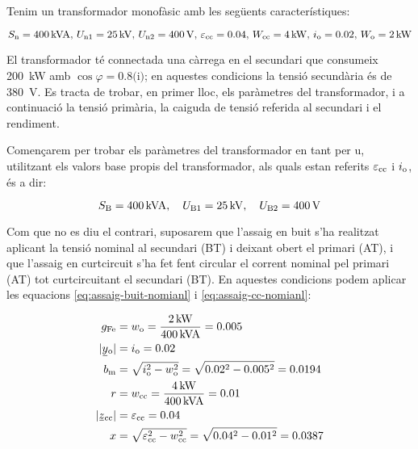 \begin{exemple}\label{ex:ParamTrafo}
	\addcontentsxms{\ParamTrafo}
    Tenim un transformador monofàsic amb les següents característiques:

    \[S_\mathrm{n}=\qty{400}{kVA},\,U_\mathrm{n1}=\qty{25}{kV},\, U_\mathrm{n2}=\qty{400}{V},\, \varepsilon_\mathrm{cc}=\num{0,04},\, W_\mathrm{cc}=\qty{4}{kW},\, i_\mathrm{o}=\num{0,02},\,  W_\mathrm{o}=\qty{2}{kW}\]

     El transformador té connectada una càrrega en el secundari que consumeix \qty{200}{kW} amb $\cos{\varphi}=\num{0,8}\text{(i)}$; en aquestes condicions la tensió secundària és de \qty{380}{V}.
    Es tracta de trobar, en primer lloc, els paràmetres del transformador, i a continuació la tensió primària, la caiguda de tensió referida al secundari i el rendiment.

    Començarem per trobar els paràmetres del transformador en tant per u, utilitzant els valors base propis del transformador, als quals estan referits $\varepsilon_\mathrm{cc}$ i $i_\mathrm{o}$, és a dir:

    \[ S_\mathrm{B}=\qty{400}{kVA},\quad U_\mathrm{B1}=\qty{25}{kV},\quad U_\mathrm{B2}=\qty{400}{V}\]

    Com que no es diu el contrari, suposarem que l'assaig en buit s'ha realitzat aplicant la tensió nominal al secundari (BT) i deixant obert el primari (AT), i que l'assaig en curtcircuit s'ha fet fent circular el corrent nominal pel primari (AT) tot curtcircuitant el secundari (BT). En aquestes condicions podem aplicar les equacions \eqref{eq:assaig-buit-nomianl} i \eqref{eq:assaig-cc-nomianl}:

   \begin{align*}
        g\ped{Fe} &= w\ped{o} = \frac{\qty{2}{kW}}{\qty{400}{kVA}} = \num{0,005} \\
        |\cmplx{y}\ped{o}| &= i\ped{o}  = \num{0,02} \\
        b\ped{m} &= \sqrt{i\ped{o}^2 - w\ped{o}^2} = \sqrt{\num{0,02}^2 - \num{0,005}^2} = \num{0,0194}\\
        r &= w\ped{cc} = \frac{\qty{4}{kW}}{\qty{400}{kVA}} = \num{0,01} \\
        |\cmplx{z}\ped{cc}| &=  \varepsilon\ped{cc} = \num{0,04} \\
        x &= \sqrt{\varepsilon\ped{cc}^2 - w\ped{cc}^2} = \sqrt{\num{0,04}^2-\num{0,01}^2} = \num{0,0387}
  \end{align*}


\end{exemple}
